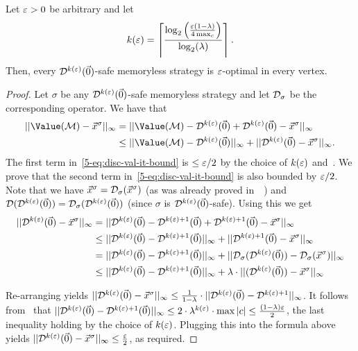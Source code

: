 \begin{lemma}
\label{5-lem:disc-val-it-eps-strategies}
Let $\varepsilon>0$ be arbitrary and let 
$$k(\varepsilon)=\left\lceil\frac{\log_2\left(\frac{\varepsilon(1-\lambda)}{4\max_{c}}\right)}{\log_2(\lambda)}
 \right\rceil .$$ Then, every 
$\mathcal{D}^{k(\varepsilon)}(\vec{0})$-safe memoryless strategy is $\varepsilon$-optimal in 
every vertex.
\end{lemma}
\begin{proof}
Let $\sigma$ be any $\mathcal{D}^{k(\varepsilon)}(\vec{0})$-safe memoryless strategy and 
let $\mathcal{D}_{\sigma}$ be the corresponding operator. We have that
\begin{align}
||\Value(\mdp) - \valsigma ||_{\infty} &= ||\Value(\mdp) 
-\discOP^{k(\eps)}(\vec{0}) +\discOP^{k(\eps)}(\vec{0}) - \valsigma 
||_{\infty} \nonumber
\\
&\leq ||\Value(\mdp) -\discOP^{k(\eps)}(\vec{0}) 
||_{\infty} + || \discOP^{k(\eps)}(\vec{0}) - \valsigma
||_{\infty}. \label{5-eq:disc-val-it-bound}
\end{align}
\noindent
The first term in~\cref{5-eq:disc-val-it-bound} is $\leq \varepsilon/2$ 
by the choice of $k(\varepsilon)$ and~. We prove 
that the second term 
in~\cref{5-eq:disc-val-it-bound} is also bounded by $\varepsilon/2$. Note that we 
have $\vec{x}^{\sigma}=\mathcal{D}_{\sigma}(\vec{x}^{\sigma})$ (as was already proved 
in~~) and $\mathcal{D}(\mathcal{D}^{k(\varepsilon)}(\vec{0})) = 
\mathcal{D}_\sigma(\mathcal{D}^{k(\varepsilon)}(\vec{0}))$ (since $\sigma$ is 
$\mathcal{D}^{k(\varepsilon)}(\vec{0})$-safe). Using this we get
\begin{align*}
|| \mathcal{D}^{k(\varepsilon)}(\vec{0}) - \vec{x}^{\sigma}
||_{\infty} & = || \mathcal{D}^{k(\varepsilon)}(\vec{0}) -\mathcal{D}^{k(\varepsilon)+1}(\vec{0}) + 
\mathcal{D}^{k(\varepsilon)+1}(\vec{0}) - \vec{x}^{\sigma}
||_{\infty}\\
&\leq || \mathcal{D}^{k(\varepsilon)}(\vec{0}) -\mathcal{D}^{k(\varepsilon)+1}(\vec{0}) ||_{\infty} + 
||\mathcal{D}^{k(\varepsilon)+1}(\vec{0}) - \vec{x}^{\sigma}
||_{\infty}
\\
&=|| \mathcal{D}^{k(\varepsilon)}(\vec{0}) -\mathcal{D}^{k(\varepsilon)+1}(\vec{0}) ||_{\infty} + 
||\mathcal{D}_\sigma(\mathcal{D}^{k(\varepsilon)}(\vec{0})) - 
\mathcal{D}_\sigma(\vec{x}^{\sigma})||_{\infty}\\
&\leq || \mathcal{D}^{k(\varepsilon)}(\vec{0}) -\mathcal{D}^{k(\varepsilon)+1}(\vec{0}) ||_{\infty} + 
\lambda\cdot||(\mathcal{D}^{k(\varepsilon)}(\vec{0})) - 
\vec{x}^{\sigma}||_{\infty}
\end{align*}

\noindent
Re-arranging yields $|| \mathcal{D}^{k(\varepsilon)}(\vec{0}) - \vec{x}^{\sigma}
||_{\infty} \leq \frac{1}{1-\lambda}\cdot|| 
\mathcal{D}^{k(\varepsilon)}(\vec{0}) - 
\mathcal{D}^{k(\varepsilon)+1}
||_{\infty} $.
It follows from~  that 
$||\mathcal{D}^{k(\varepsilon)}(\vec{0}) -\mathcal{D}^{k(\varepsilon)+1}(\vec{0}) ||_{\infty} 
\leq 2\cdot\lambda^{k(\varepsilon)}\cdot \max|c|\leq 
\frac{(1-\lambda)\varepsilon}{2}$, the last 
inequality holding by the choice of $k(\varepsilon)$. Plugging this into the 
formula above yields $|| \mathcal{D}^{k(\varepsilon)}(\vec{0}) - \vec{x}^{\sigma}
||_{\infty} \leq\frac{\varepsilon}{2}$, as required. 
%
\end{proof}



